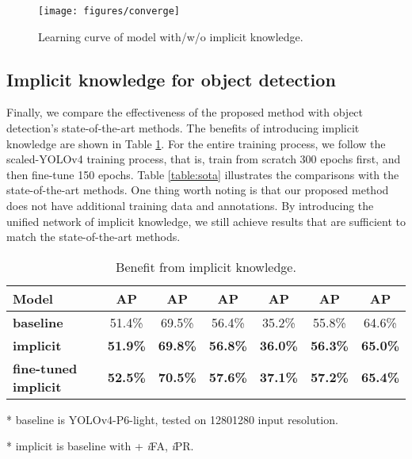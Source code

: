 \documentclass[10pt,twocolumn,letterpaper]{article}
\begin{document}
\begin{figure}[h]
	\vspace{-4mm}
	\begin{center}
		\texttt{[image: figures/converge]}
	\end{center}
	\vspace{2mm}
	\caption{Learning curve of model with/w/o implicit knowledge.}
	\label{fig:con}
	\vspace{-2mm}
\end{figure}
 
\newpage

\subsection{Implicit knowledge for object detection}
\label{sec:od}

Finally, we compare the effectiveness of the proposed method with object detection's state-of-the-art methods. The benefits of introducing implicit knowledge are shown in Table \ref{table:as}. For the entire training process, we follow the scaled-YOLOv4 \cite{wang2020scaled} training process, that is, train from scratch 300 epochs first, and then fine-tune 150 epochs. Table \ref{table:sota} illustrates the comparisons with the state-of-the-art methods. One thing worth noting is that our proposed method does not have additional training data and annotations. By introducing the unified network of implicit knowledge, we still achieve results that are sufficient to match the state-of-the-art methods.

\begin{table}[h]
	\centering
	\vspace{-2mm}
	\begin{threeparttable}[h]
		\footnotesize
		\caption{Benefit from implicit knowledge.}
		\label{table:as}
		\setlength\tabcolsep{2.5pt}
		\begin{tabular}{lcccccc}
			\toprule
			\textbf{Model} & \textbf{AP} & \textbf{AP} & \textbf{AP} & \textbf{AP} & \textbf{AP} & \textbf{AP} \\				
			\midrule
			\textbf{baseline} & 51.4\% & 69.5\% & 56.4\% & 35.2\% & 55.8\% & 64.6\% \\
			\textbf{implicit} & \textbf{51.9\%} & \textbf{69.8\%} & \textbf{56.8\%} & \textbf{36.0\%} & \textbf{56.3\%} & \textbf{65.0\%} \\
			\textbf{fine-tuned implicit} & \textbf{52.5\%} & \textbf{70.5\%} & \textbf{57.6\%} & \textbf{37.1\%} & \textbf{57.2\%} & \textbf{65.4\%} \\		
			\bottomrule
		\end{tabular}
		\begin{tablenotes}[flushleft]
			\footnotesize
			\item[*] baseline is YOLOv4-P6-light, tested on 12801280 input resolution.
			\item[*] implicit is baseline with + \textit{i}FA,  \textit{i}PR.
		\end{tablenotes}
	\end{threeparttable}
    \vspace{-4mm}
\end{table}
\end{document}

